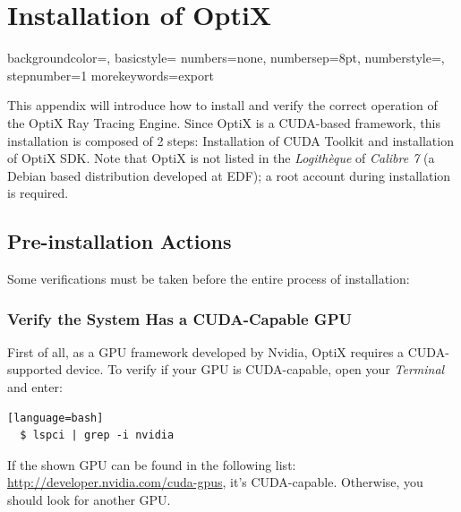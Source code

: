 
\chapter{Installation of OptiX} %

\label{AppendixA} %


{
    backgroundcolor=\color{black},
    basicstyle=\scriptsize\color{white}\ttfamily
    numbers=none,
    numbersep=8pt,                   %
    numberstyle=\tiny\color{white}, %
    stepnumber=1                    %
}
{
  morekeywords={export}
}

This appendix will introduce how to install and verify the correct operation of the OptiX Ray Tracing Engine. Since OptiX is a CUDA-based framework, this installation is composed of 2 steps: Installation of CUDA Toolkit and installation of OptiX SDK. Note that OptiX is not listed in the \textit{Logithèque} of \textit{Calibre 7} (a Debian based distribution developed at EDF); a root account during installation is required.


\section{Pre-installation Actions}
Some verifications must be taken before the entire process of installation:


\subsection{Verify the System Has a CUDA-Capable GPU}
First of all, as a GPU framework developed by Nvidia, OptiX requires a CUDA-supported device. To verify if your GPU is CUDA-capable, open your \textit{Terminal} and enter:
\begin{lstlisting}[style=DOS][language=bash]
  $ lspci | grep -i nvidia
\end{lstlisting}
If the shown GPU can be found in the following list: \href{http://developer.nvidia.com/cuda-gpus}{http://developer.nvidia.com/cuda-gpus}, it's CUDA-capable. Otherwise, you should look for another GPU.

